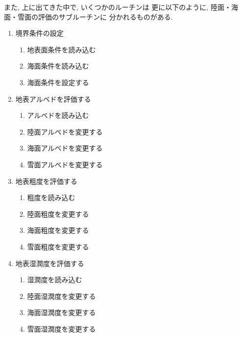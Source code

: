 また, 上に出てきた中で, いくつかのルーチンは
更に以下のように, 陸面・海面・雪面の評価のサブルーチンに
分かれるものがある.

\begin{enumerate}
\item 境界条件の設定 
      \begin{enumerate}
      \item 地表面条件を読み込む 
      \item 海面条件を読み込む 
      \item 海面条件を設定する 
      \end{enumerate}
\item 地表アルベドを評価する 
      \begin{enumerate}
      \item アルベドを読み込む 
      \item 陸面アルベドを変更する 
      \item 海面アルベドを変更する 
      \item 雪面アルベドを変更する 
      \end{enumerate}
\item 地表粗度を評価する 
      \begin{enumerate}
      \item 粗度を読み込む 
      \item 陸面粗度を変更する 
      \item 海面粗度を変更する 
      \item 雪面粗度を変更する 
      \end{enumerate}
\item 地表湿潤度を評価する  \\
      \begin{enumerate}
      \item 湿潤度を読み込む 
      \item 陸面湿潤度を変更する 
      \item 海面湿潤度を変更する 
      \item 雪面湿潤度を変更する 
      \end{enumerate}
\end{enumerate}

